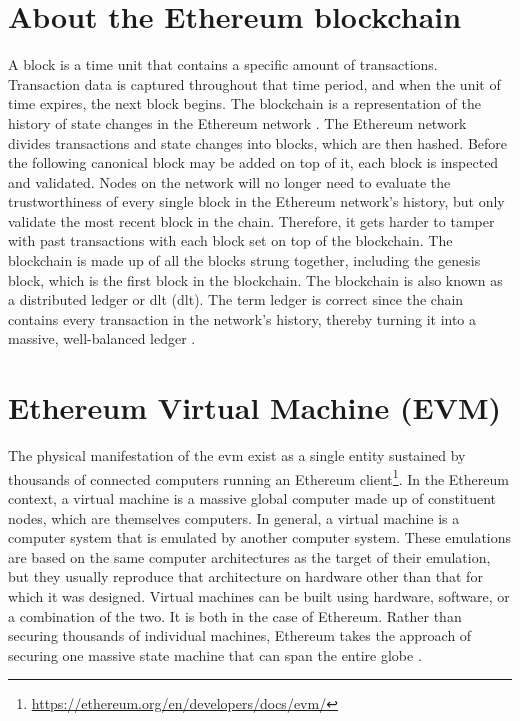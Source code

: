 \documentclass[final]{vutinfth}
\begin{document}
\section{About the Ethereum blockchain}
A block is a time unit that contains a specific amount of transactions. Transaction data is captured throughout that time period, and when the unit of time expires, the next block begins. The blockchain is a representation of the history of state changes in the Ethereum network \cite[43]{dannen2017introducing}.
The Ethereum network divides transactions and state changes into blocks, which are then hashed. Before the following canonical block may be added on top of it, each block is inspected and validated. Nodes on the network will no longer need to evaluate the trustworthiness of every single block in the Ethereum network's history, but only validate the most recent block in the chain. Therefore, it gets harder to tamper with past transactions with each block set on top of the blockchain. The blockchain is made up of all the blocks strung together, including the genesis block, which is the first block in the blockchain. The blockchain is also known as a distributed ledger or \acrlong{dlt} (\acrshort{dlt}). The term ledger is correct since the chain contains every transaction in the network's history, thereby turning it into a massive, well-balanced ledger \cite[55]{dannen2017introducing}. 
\section{Ethereum Virtual Machine (EVM)}
\label{sec:evm}
The physical manifestation of the \acrshort{evm} exist as a single entity sustained by thousands of connected computers running an Ethereum client\footnote{\url{https://ethereum.org/en/developers/docs/evm/}}.
In the Ethereum context, a virtual machine is a massive global computer made up of constituent nodes, which are themselves computers. In general, a virtual machine is a computer system that is emulated by another computer system. These emulations are based on the same computer architectures as the target of their emulation, but they usually reproduce that architecture on hardware other than that for which it was designed. Virtual machines can be built using hardware, software, or a combination of the two. It is both in the case of Ethereum. Rather than securing thousands of individual machines, Ethereum takes the approach of securing one massive state machine that can span the entire globe \cite[48]{dannen2017introducing}.
\end{document}
